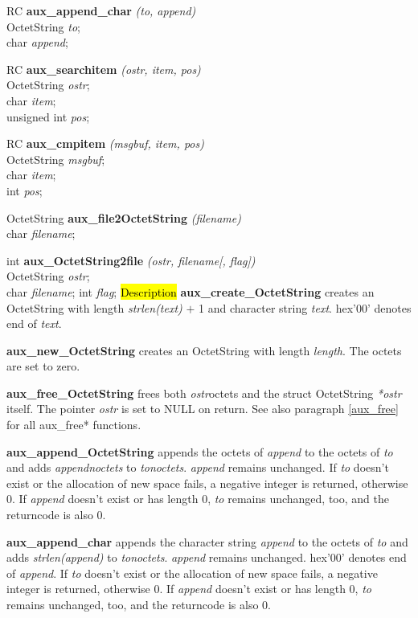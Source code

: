 RC {\bf aux\_append\_char} {\em (to, append)} \\
OctetString {\em *to};    \\
char {\em *append};

RC {\bf aux\_searchitem} {\em (ostr, item, pos)} \\
OctetString {\em *ostr};    \\
char {\em *item};    \\
unsigned int {\em *pos};

RC {\bf *aux\_cmpitem} {\em (msgbuf, item, pos)}  \\
OctetString {\em *msgbuf};    \\
char {\em *item};    \\
int {\em pos};

OctetString {\bf *aux\_file2OctetString} {\em (filename)} \\
char {\em *filename};

int {\bf aux\_OctetString2file} {\em (ostr, filename[, flag])} \\
OctetString {\em *ostr};    \\
char {\em *filename};
int {\em flag};
\hl{Description}
{\bf aux\_create\_OctetString} creates an OctetString with length {\em strlen(text)} $+$ 1
and character string {\em text}.
hex'00' denotes end of {\em text}.

{\bf aux\_new\_OctetString} creates an OctetString with length {\em length}. The octets
are set to zero.

{\bf aux\_free\_OctetString} frees both 
{\em *ostr}\pf octets and the struct OctetString {\em **ostr} itself.
The pointer {\em *ostr} is set to NULL on return.
See also paragraph \ref{aux_free} for all aux\_free* functions.

{\bf aux\_append\_OctetString} appends the octets of {\em append} to the octets
of {\em to}
and adds {\em append\pf noctets} to {\em to\pf noctets}.
{\em append} remains unchanged.
If {\em to} doesn't exist or the allocation of new space fails,
a negative integer is returned, otherwise 0.
If {\em append} doesn't exist or has length 0, {\em to}
remains unchanged, too, and the returncode is also 0.

{\bf aux\_append\_char} appends the character string {\em append} to the octets
of {\em to} and adds {\em strlen(append)} to {\em to\pf noctets}.
{\em append} remains unchanged.
hex'00' denotes end of {\em append}.
If {\em to} doesn't exist or the allocation of new space fails,
a negative integer is returned, otherwise 0.
If {\em append} doesn't exist or has length 0, {\em to}
remains unchanged, too, and the returncode is also 0.

